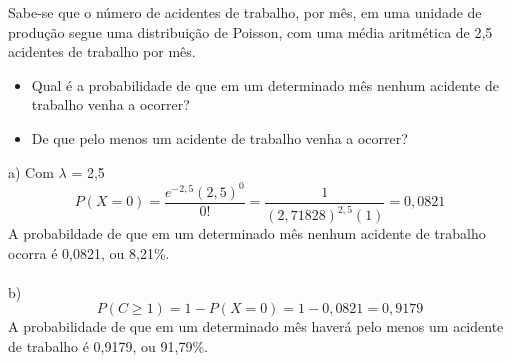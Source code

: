 \documentclass[10pt,a4paper]{article}
\begin{document}
\begin{eg}
	Sabe-se que o número de acidentes de trabalho, por mês, em uma unidade de produção segue uma distribuição de Poisson, com uma média aritmética de 2,5  acidentes de trabalho por mês.
	\begin{itemize}
		\item Qual é a probabilidade de que em um determinado mês nenhum acidente de trabalho venha a ocorrer?
		\item De que pelo menos um acidente de trabalho venha a ocorrer?
	\end{itemize}
\end{eg}

\begin{sol}
	a) Com $\lambda$ = 2,5
	\[
		P(X = 0) = \frac{e^{-2,5}(2,5)^{0}}{0!} = \frac{1}{(2,71828)^{2,5}(1)} = 0,0821
	\]
	A probabildade de que em um determinado mês nenhum acidente de trabalho ocorra é 0,0821,  ou 8,21\%.\\\\
	b) 
	\[
		P(C \geq 1) = 1 - P(X = 0) = 1 - 0,0821 = 0,9179
	\]
	A probabilidade de que em um determinado mês haverá pelo menos um acidente de trabalho é  0,9179, ou 91,79\%.
\end{sol}
\end{document}
